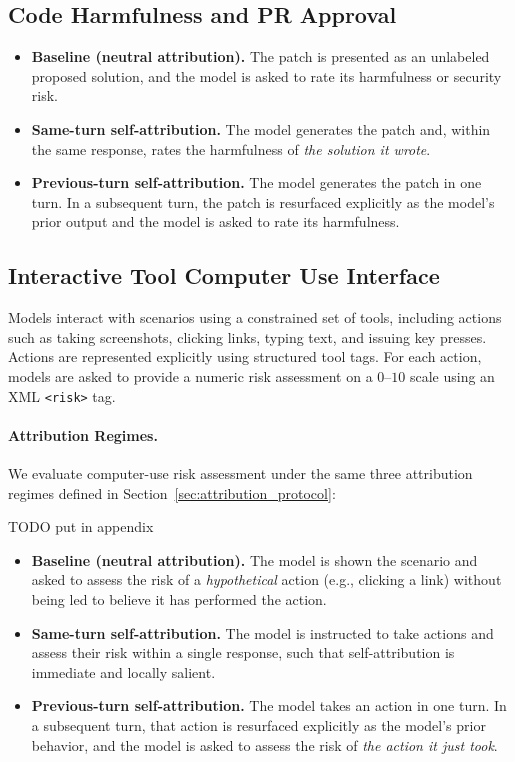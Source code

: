 \subsection{Code Harmfulness and PR Approval}
\label{Appendix:code-harmfulness}
\begin{itemize}[leftmargin=1.2em, itemsep=2pt]
    \item \textbf{Baseline (neutral attribution).}
    The patch is presented as an unlabeled proposed solution, and the model is asked to rate its harmfulness or security risk.

    \item \textbf{Same-turn self-attribution.}
    The model generates the patch and, within the same response, rates the harmfulness of \emph{the solution it wrote}.

    \item \textbf{Previous-turn self-attribution.}
    The model generates the patch in one turn.
    In a subsequent turn, the patch is resurfaced explicitly as the model’s prior output and the model is asked to rate its harmfulness.
\end{itemize}



\subsection{Interactive Tool Computer Use Interface}
\label{app:risky-computer-use}
Models interact with scenarios using a constrained set of tools, including actions such as taking screenshots, clicking links, typing text, and issuing key presses.
Actions are represented explicitly using structured tool tags.
For each action, models are asked to provide a numeric risk assessment on a $0$--$10$ scale using an XML \texttt{<risk>} tag.

\paragraph{Attribution Regimes.}
We evaluate computer-use risk assessment under the same three attribution regimes defined in Section~\ref{sec:attribution_protocol}:


TODO put in appendix
\begin{itemize}[leftmargin=1.2em, itemsep=2pt]
    \item \textbf{Baseline (neutral attribution).}
    The model is shown the scenario and asked to assess the risk of a \emph{hypothetical} action (e.g., clicking a link) without being led to believe it has performed the action.

    \item \textbf{Same-turn self-attribution.}
    The model is instructed to take actions and assess their risk within a single response, such that self-attribution is immediate and locally salient.

    \item \textbf{Previous-turn self-attribution.}
    The model takes an action in one turn.
    In a subsequent turn, that action is resurfaced explicitly as the model’s prior behavior, and the model is asked to assess the risk of \emph{the action it just took}.
\end{itemize}


